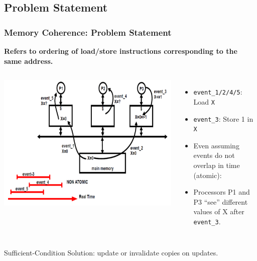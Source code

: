 \documentclass{beamer}
\renewcommand{\emph}[1]{\textcolor{structure}{#1}}
\begin{document}
\subsection{Problem Statement}

\begin{frame}[fragile]
	\tableofcontents[currentsection]
\end{frame}

\begin{frame}[fragile,t]
\frametitle{Memory Coherence: Problem Statement}

{\bf Refers to ordering of load/store instructions corresponding
to the same address.}

\begin{columns}
\includegraphics[width=50ex]{Ch7Figs/ProblemMemCoh}\pause
{}
\begin{itemize}
    \item {\tt event\_1/2/4/5}: Load {\tt X}
    \item {\tt event\_3}: Store 1 in {\tt X}
    \item Even assuming events do not overlap in time (atomic):
    \item Processors P1 and P3 ``see'' different values of X after {\tt event\_3}.  
\end{itemize}
\end{columns}

\emph{Sufficient-Condition Solution: update or invalidate copies on updates. }

\end{frame}
\end{document}
